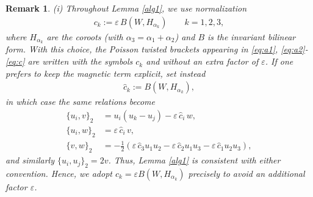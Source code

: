 \documentclass[11pt]{amsart}
\theoremstyle{definition}
\theoremstyle{plain}
\newtheorem{remark}[theorem]{Remark}
\theoremstyle{conclusion}
\begin{document}
\begin{remark}  \label{rem:magneticcoup}
(i) Throughout Lemma \ref{alg1}, we use normalization  \begin{align}
    c_k :=\varepsilon\,B \left(W,H_{\alpha_k}\right)\qquad k=1,2,3,
\end{align} where $H_{\alpha_k}$ are the coroots (with $\alpha_3=\alpha_1+\alpha_2$) and $B$ is the invariant bilinear form. With this choice, the Poisson twisted brackets appearing in \eqref{eq:a1}, \eqref{eq:a2}-\eqref{eq:c} are written with the symbols $c_k$ and without an extra factor of $\varepsilon$. %
If one prefers to keep the magnetic term explicit, set instead \begin{align*}
    \widehat{c}_k :=B \left(W,H_{\alpha_k}\right),
\end{align*} in which case the same relations become \begin{align*}
\{u_i,v\}_2 &=u_i(u_k-u_j)-\varepsilon\,\widehat{c}_i\,w,\\
\{u_i,w\}_2 &=\varepsilon\,\widehat{c}_i\,v,\\
\{v,w\}_2 &=-\frac{1}{2} \left(\varepsilon\,\widehat{c}_3 u_1u_2-\varepsilon\,\widehat{c}_2 u_1u_3-\varepsilon\,\widehat{c}_1 u_2u_3\right),
\end{align*} and similarly $\{u_i,u_j\}_2=2v$. Thus, Lemma \ref{alg1} is consistent with either convention. Hence, we adopt $c_k=\varepsilon B(W,H_{\alpha_k})$ precisely to avoid an additional factor $\varepsilon$. 
 

\end{remark}
\end{document}
